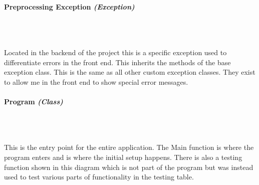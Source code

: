 \begin{FlushLeft}
    \pagebreak
\paragraph{Preprocessing Exception \textit{(Exception)}} \mbox{} \\

    \begin{figure}[H]
        \centering
    \end{figure}\\
    Located in the backend of the project this is a specific exception used to differentiate errors in the front end. This inherits the methods of the base exception class. This is the same as all other custom exception classes. They exist to allow me in the front end to show special error messages.
    \bk

\paragraph{Program \textit{(Class)}} \mbox{} \\

    \begin{figure}[H]
        \centering
    \end{figure}\\

    This is the entry point for the entire application. The Main function is where the program enters and is where the initial setup happens. There is also a testing function shown in this diagram which is not part of the program but was instead used to test various parts of functionality in the testing table. \\ \bk


\end{FlushLeft}
